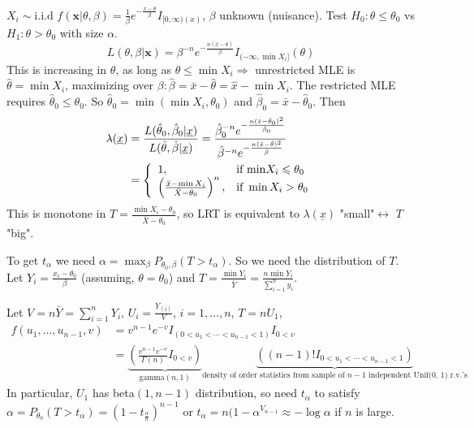 \documentclass[english, 11pt]{article}
\newcommand{\lp}{\left(}
\newcommand{\rp}{\right)}
\begin{document}
\begin{exmp}\label{exmp:526}
$X_i\sim \text{i.i.d }f(\bm{x}|\theta, \beta)=\frac{1}{\beta}e^{-\frac{x-\theta}{\beta}}I_{[0, \infty)(x)}$, $\beta$ unknown (nuisance). Test $H_0:\theta\leqslant \theta_0$ vs $H_1:\theta>\theta_0$ with size $\alpha$.
$$
L(\theta, \beta|\bm{x})=\beta^{-n}e^{-\frac{n(\bar{x}-\theta)}{\beta}}I_{(-\infty, \min X_i]}(\theta)
$$
This is increasing in $\theta$, as long as $\theta\leqslant\min X_i\Rightarrow$ unrestricted MLE is $\hat{\theta}=\min X_i$, maximizing over $\beta:\hat{\beta}=\bar{x}-\hat{\theta}=\hat{x}-\min X_i$. The restricted MLE requires $\hat{\theta}_0\leqslant\theta_0$. So $\hat{\theta}_0=\min(\min X_i, \theta_0)$ and $ \hat{\beta}_0=\bar{x}-\hat{\theta}_0$. Then
$$\begin{aligned}
\lambda(\underline{x})&=\frac{L(\hat{\theta}_0, \hat{\beta}_0|\underline{x})}{L(\hat{\theta}, \hat{\beta}|\underline{x})}=\frac{\hat{\beta}_0^{-n}e^{-\frac{n(\bar{x}-\hat{\theta}_0)^2}{\hat{\beta}_0}}}{\hat{\beta}^{-n}e^{-\frac{n(\bar{x}-\hat{\theta})^2}{\hat{\beta}}}}\\
&=\left\lbrace\begin{array}{l l}
1,  & \text{if min}X_i\leqslant \theta_0\\
\lp\frac{\bar{x}-\min X_i}{\bar{X}-\theta_0}\rp^n, &\text{if }\min X_i>\theta_0
\end{array}\right.
\end{aligned}
$$
This is monotone in $T=\frac{\min X_i-\theta_0}{\bar{X}-\theta_0}$, so LRT is equivalent to $\lambda(\underline{x})$ "small"$\leftrightarrow$ $T$ "big".

To get $t_\alpha$ we need $\alpha=\max_\beta P_{\theta_0, \beta}(T>t_\alpha)$. So we need the distribution of $T$. Let $Y_i=\frac{x_i-\theta_0}{\beta}$ (assuming, $\theta=\theta_0$) and $T=\frac{\min Y_i}{\bar{Y}}=\frac{n\min Y_i}{\sum_{i=1}^ny_i}$. 

Let $V=n\bar{Y}=\sum_{i=1}^nY_i$, $U_i=\frac{Y_{(i)}}{V}$, $i=1, \dots, n$, $T=nU_1$,
\begin{equation*}
\begin{aligned}
f(u_1, \dots, u_{n-1}, v)&=v^{n-1}e^{-v}I_{(0<u_1<\cdots<u_{n-1}<1)}I_{0<v}\\
&=\underbrace{\lp\frac{v^{n-1}e^{-v}}{\Gamma(n)}I_{0<v} \rp}_{\text{gamma}(n, 1)} \underbrace{\lp(n-1)!I_{0<u_1<\cdots<u_{n-1}<1} \rp}_{\text{density of order statistics from sample of $n-1$ independent Unif(0, 1) r.v.'s}}
\end{aligned}
\end{equation*}
In particular, $U_1$ has beta$(1, n-1)$ distribution, so need $t_{\alpha}$ to satisfy $\alpha=P_{\theta_0}(T>t_\alpha)=\lp 1-t_{\frac{\alpha}{n}}\rp^{n-1}$ or $t_{\alpha}=n(1-\alpha^{V_{n-1}}\approx-\log \alpha $ if $n$ is large.
\end{exmp}
\end{document}
